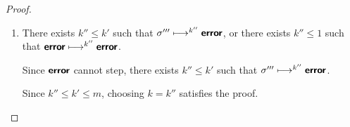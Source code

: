 \begin{proof}
\begin{enumerate}
\begin{itemize}
\begin{enumerate}
        Hence $\conf''' \ctxstepsto^{i''} \error$.

        Since $i'' \leq k' \leq m$, choosing $k = i''$ satisfies the
        proof.

      \item There exists $k'' \leq k'$ such that $\sigma'''
        \longmapsto^{k''} \textbf{\textsf{error}}$, or there exists $k'' \leq 1$ such
        that $\textbf{\textsf{error}} \longmapsto^{k''} \textbf{\textsf{error}}$.

        Since $\textbf{\textsf{error}}$ cannot step, there exists $k'' \leq k'$ such
        that $\sigma''' \longmapsto^{k''} \textbf{\textsf{error}}$.

        Since $k'' \leq k' \leq m$, choosing $k = k''$ satisfies the
        proof.
      \end{enumerate}
    \end{itemize}
  \end{enumerate}

\end{proof}
